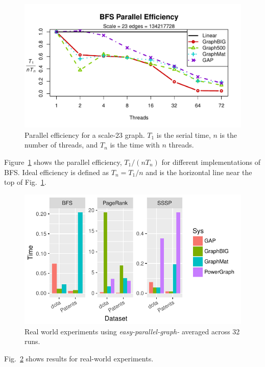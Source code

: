 \documentclass[conference]{IEEEtran}
\begin{document}
\begin{figure}[htb]
	\centering
		\includegraphics[width=0.95\linewidth, trim=0 18pt 24pt 18pt, clip]{graphics/bfs_ss23.pdf}
	\caption{Parallel efficiency for a scale-23 graph. $T_1$ is the serial time, $n$ is the number of threads, and $T_n$ is the time with $n$ threads.}
	\label{fig:bfs-efficiency}
\end{figure}
Figure~\ref{fig:bfs-efficiency} shows the parallel efficiency, $T_1 / (nT_n)$ for different implementations of BFS. Ideal efficiency is defined as $T_n = T_1/n$ and is the horizontal line near the top of Fig.~\ref{fig:bfs-efficiency}.

\begin{figure}
	\centering
	\includegraphics[width=0.95\linewidth, trim=0 18pt 6pt 6pt, clip]{graphics/compare-realworld.pdf}
	\caption{Real world experiments using \emph{easy-parallel-graph-\textasteriskcentered} averaged across 32 runs.}
	\label{fig:epg-realworld}
\end{figure}

Fig.~\ref{fig:epg-realworld} shows results for real-world experiments.
\end{document}

